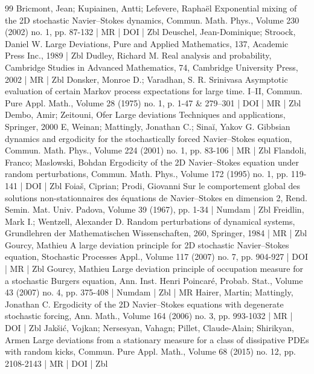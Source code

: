 \documentclass[10pt]{amsart}
\theoremstyle{definition}\newtheorem{defi}[theo]{Definition}\newtheorem{rema}[theo]{Remark}\newtheorem{exam}[theo]{Example}\newtheorem{exem}[theo]{Example}\newtheorem{nota}[theo]{Notation}
\begin{document}
\begin{thebibliography}{99}
Bricmont, Jean; Kupiainen, Antti; Lefevere, Raphaël Exponential mixing of the 2D stochastic Navier–Stokes dynamics, Commun. Math. Phys., Volume 230 (2002) no. 1, pp. 87-132 | MR | DOI | Zbl
Deuschel, Jean-Dominique; Stroock, Daniel W. Large Deviations, Pure and Applied Mathematics, 137, Academic Press Inc., 1989 | Zbl
Dudley, Richard M. Real analysis and probability, Cambridge Studies in Advanced Mathematics, 74, Cambridge University Press, 2002 | MR | Zbl
Donsker, Monroe D.; Varadhan, S. R. Srinivasa Asymptotic evaluation of certain Markov process expectations for large time. I–II, Commun. Pure Appl. Math., Volume 28 (1975) no. 1, p. 1-47 \& 279–301 | DOI | MR | Zbl
Dembo, Amir; Zeitouni, Ofer Large deviations Techniques and applications, Springer, 2000
E, Weinan; Mattingly, Jonathan C.; Sinaĭ, Yakov G. Gibbsian dynamics and ergodicity for the stochastically forced Navier–Stokes equation, Commun. Math. Phys., Volume 224 (2001) no. 1, pp. 83-106 | MR | Zbl
Flandoli, Franco; Maslowski, Bohdan Ergodicity of the 2D Navier–Stokes equation under random perturbations, Commun. Math. Phys., Volume 172 (1995) no. 1, pp. 119-141 | DOI | Zbl
Foiaš, Ciprian; Prodi, Giovanni Sur le comportement global des solutions non-stationnaires des équations de Navier–Stokes en dimension 2, Rend. Semin. Mat. Univ. Padova, Volume 39 (1967), pp. 1-34 | Numdam | Zbl
Freidlin, Mark I.; Wentzell, Alexander D. Random perturbations of dynamical systems, Grundlehren der Mathematischen Wissenschaften, 260, Springer, 1984 | MR | Zbl
Gourcy, Mathieu A large deviation principle for 2D stochastic Navier–Stokes equation, Stochastic Processes Appl., Volume 117 (2007) no. 7, pp. 904-927 | DOI | MR | Zbl
Gourcy, Mathieu Large deviation principle of occupation measure for a stochastic Burgers equation, Ann. Inst. Henri Poincaré, Probab. Stat., Volume 43 (2007) no. 4, pp. 375-408 | Numdam | Zbl | MR
Hairer, Martin; Mattingly, Jonathan C. Ergodicity of the 2D Navier–Stokes equations with degenerate stochastic forcing, Ann. Math., Volume 164 (2006) no. 3, pp. 993-1032 | MR | DOI | Zbl
Jakšić, Vojkan; Nersesyan, Vahagn; Pillet, Claude-Alain; Shirikyan, Armen Large deviations from a stationary measure for a class of dissipative PDEs with random kicks, Commun. Pure Appl. Math., Volume 68 (2015) no. 12, pp. 2108-2143 | MR | DOI | Zbl

\end{thebibliography}
\end{document}
